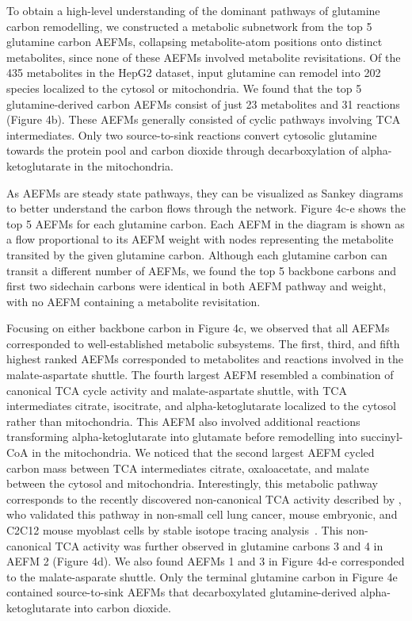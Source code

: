 \documentclass[12pt]{article}
\begin{document}

To obtain a high-level understanding of the dominant pathways of glutamine
carbon remodelling, we constructed a metabolic subnetwork from the top
5 glutamine carbon AEFMs, collapsing metabolite-atom positions onto
  distinct metabolites, since none of these AEFMs involved metabolite
  revisitations. Of the 435 metabolites in the HepG2 dataset, input
  glutamine can remodel into 202 species localized to the cytosol or
  mitochondria. We found that the top 5 glutamine-derived carbon AEFMs
  consist of just 23 metabolites and 31 reactions (Figure 4b). These AEFMs
  generally consisted of cyclic pathways involving TCA intermediates. Only
  two source-to-sink reactions convert cytosolic glutamine towards the
  protein pool and carbon dioxide through decarboxylation of
  alpha-ketoglutarate in the mitochondria.

As AEFMs are steady state pathways, they can be visualized as Sankey
diagrams to better understand the carbon flows through the network. Figure
4c-e shows the top 5 AEFMs for each glutamine carbon. Each AEFM in the
diagram is shown as a flow proportional to its AEFM weight with nodes
representing the metabolite transited by the given glutamine carbon.
Although each glutamine carbon can transit a different number of AEFMs, we
found the top 5 backbone carbons and first two sidechain carbons were identical
in both AEFM pathway and weight, with no AEFM containing a metabolite
revisitation.

Focusing on either backbone carbon in Figure 4c, we observed that all
AEFMs corresponded to well-established metabolic subsystems. The first,
third, and fifth highest ranked AEFMs corresponded to metabolites and
reactions involved in the malate-aspartate shuttle. The fourth largest AEFM
resembled a combination of canonical TCA cycle activity and malate-aspartate
shuttle, with TCA intermediates citrate, isocitrate, and alpha-ketoglutarate
localized to the cytosol rather than mitochondria. This AEFM also involved
additional reactions transforming alpha-ketoglutarate into glutamate before
remodelling into succinyl-CoA in the mitochondria. We noticed that the second
largest AEFM cycled carbon mass between TCA intermediates citrate,
oxaloacetate, and malate between the cytosol and mitochondria. Interestingly,
this metabolic pathway corresponds to the recently discovered non-canonical TCA
activity described by \citeauthor{ArnoldPaigeK2022Anta}, who
validated this pathway in non-small cell lung cancer, mouse embryonic, and
C2C12 mouse myoblast cells by stable isotope tracing
analysis~\citep{ArnoldPaigeK2022Anta}. This non-canonical TCA activity was
further observed in glutamine carbons 3 and 4 in AEFM 2 (Figure 4d). We also
found AEFMs 1 and 3 in Figure 4d-e corresponded to the malate-asparate shuttle.
Only the terminal glutamine carbon in Figure 4e contained source-to-sink AEFMs
that decarboxylated glutamine-derived alpha-ketoglutarate into carbon dioxide.
\end{document}
